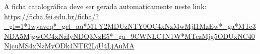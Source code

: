 
\begin{center}
\large{A ficha catalográfica deve ser gerada automaticamente neste link: 
\url{https://ficha.fei.edu.br/ficha/?_gl=1*1wyaveq*_gcl_au*MTY2MDUzNTY0OC4xNzMwMjI1MzEw*_ga*MTc3NDA5MjgwOC4xNzIyNDQ3NzE5*_ga_9CWNLCJN1W*MTczMjg5ODUxNC40NjcuMS4xNzMyODk4NTE2LjU4LjAuMA}}
\end{center}
